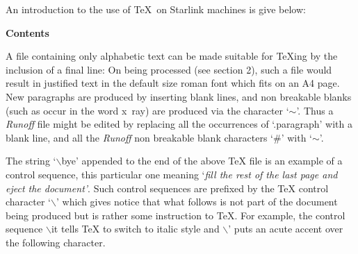 An introduction to the use of \TeX\  on Starlink machines is give below:

\bigskip

{\bf \big Contents}

\medskip
\medskip
{}
\medskip
{}
\medskip
{}
\medskip
{}



\vfil\eject
{}

A file containing only alphabetic text can be made suitable for \TeX ing by
the inclusion of a final line:
\medskip
{}
On being processed (see section 2), such a file would result in
justified text in the default size roman font which fits on an A4 page.
New paragraphs are produced by inserting blank lines, and non breakable blanks
(such as occur in the word x~ray) are produced via the character
`\th$\sim$\th'.
Thus a {\it Runoff}{} file might be edited by replacing all the occurrences of
`.paragraph' with a blank line, and all the {\it Runoff} non breakable blank
characters `\#' with `\th$\sim$\th'.



The string `$\backslash$bye' appended to the end of the above {\TeX} file
is an example
of a control sequence, this particular one meaning `{\it fill the rest of
the last page and eject the document'}.
Such control sequences are prefixed by the {\TeX} control character
`$\backslash$'
 which gives
notice that what follows is not part of the document being produced but is
rather some instruction to \TeX.
For example, the control sequence $\backslash$it tells {\TeX} to
switch to italic style
and $\backslash$' puts an acute accent over the following character.

